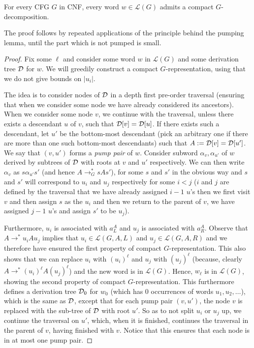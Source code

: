 \documentclass{CSML}
\newcommand{\lang}{\mathcal{L}}
\begin{document}
\begin{lem}\label{lem:comp_deco}
For every CFG $G$ in CNF, every word $w \in \lang(G)$ admits a compact $G$-decomposition.
\end{lem}
\smallskip{} The proof follows by repeated applications of the principle behind the pumping lemma, until the part which is not pumped is small.
\begin{proof}
Fix some $\ell$ and consider some word $w$ in $\lang(G)$ and some derivation tree $\mathcal{D}$ for $w$.
 We will greedily construct a compact $G$-representation, using that we do not give bounds on $|u_i|$. 

 \smallskip{}
 The idea is to consider nodes of $\mathcal{D}$ in a depth first pre-order traversal (ensuring that when we consider some node we have already considered its ancestors). 
 When we consider some node $v$, we continue with the traversal, 
 unless there exists a descendant $u$ of $v$, such that $\mathcal{D}[v]=\mathcal{D}[u]$. 
 If there exists such a descendant, let $u'$ be the bottom-most descendant (pick an arbitrary one if there are more than one such bottom-most descendants) such that $A:=\mathcal{D}[v]=\mathcal{D}[u']$. 
 We say that $(v,u')$ forms a {\em pump pair} of $w$.
Consider subword $\alpha_v, \alpha_{u'}$ of $w$ derived by subtrees of $\mathcal{D}$ with roots at $v$ and $u'$ respectively.
 We can then write $\alpha_v$ as $s \alpha_{u'} s'$
 (and hence $A\rightarrow_G^* s A s'$), for some $s$ and $s'$ in the obvious way and $s$ and $s'$ will correspond to $u_i$ and $u_j$ respectively for some $i<j$ ($i$ and $j$ are defined by the traversal that we have already assigned $i-1$ $u$'s then we first visit $v$ and then assign $s$ as the $u_i$ and then we return to the parent of $v$, we have assigned $j-1$ $u$'s and assign $s'$ to be $u_j$). 

 Furthermore, $u_i$ is associated with $a_L^A$ and $u_j$ is associated with $a_R^A$. 
Observe that $A\rightarrow^* u_i A u_j$ implies that $u_i\in \lang(G,A,L)$ and $u_j\in \lang(G,A,R)$ and we therefore have ensured the first property of compact $G$-representation. 
 This also shows that we can replace $u_i$ with $(u_i)^\ell$ and $u_j$ with $(u_j)^\ell$ (because, clearly $A\rightarrow^* (u_i)^\ell A (u_j)^\ell$) and the new word is in $\lang(G)$. 
 Hence, $w_\ell$ is in $\lang(G)$, showing the second property of compact $G$-representation.
 This furthermore defines a derivation tree $\mathcal{D}_0$ for $w_0$ (which has $0$ occurrences of words $u_1, u_2, \ldots$), 
 which is the same as $\mathcal{D}$, except that for each pump pair $(v,u')$, the node $v$ is replaced with the sub-tree of $\mathcal{D}$ with root $u'$.
So as to  not split $u_i$ or $u_j$ up, we continue the traversal on $u'$, which, when it is finished, continues the traversal in the parent of $v$, having finished with $v$.  Notice that this ensures that each node is in at most one pump pair. 



\end{proof}
\end{document}
